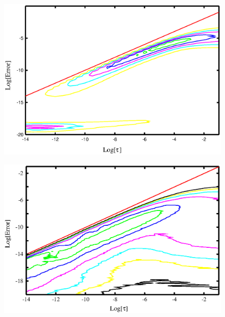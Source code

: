 \documentclass[prb,aps,nobibnotes,superbib,preprint]{revtex4}
\begin{document}
\begin{figure}
\caption{}
{\centering \includegraphics {Error_vs_TauMAC_bin_Water512.ps} \par} 
\label{figure:MultipoleErrorWaterC512} 
\end{figure}

\begin{figure}
\caption{}
{\centering \includegraphics{Error_vs_TauMAC_Water64_bin.ps} \par} 
\label{figure:MultipoleErrorWaterQ64} 
\end{figure}
\end{document}
